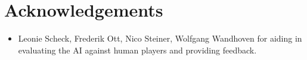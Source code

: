 \documentclass[12pt]{article}
\newcommand{\incFile}[2]{\label{code:#2}}
\begin{document}



\section*{Acknowledgements}
\begin{itemize}
\item Leonie Scheck, Frederik Ott, Nico Steiner, Wolfgang Wandhoven for aiding in evaluating the AI against human players and providing feedback.
\end{itemize}

\end{document}
